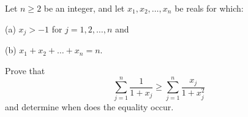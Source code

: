Let $n \ge 2$ be an integer, and let $x_1, x_2, \ldots, x_n$ be reals for which:

(a) $x_j > -1$ for $j = 1, 2,  \ldots, n$ and

(b) $x_1 + x_2 + \ldots + x_n = n.$

Prove that $$ \sum_{j = 1}^{n} \frac{1}{1 + x_j} \ge \sum_{j = 1}^{n} \frac{x_j}{1 + x_j^2} $$and determine when does the equality occur.